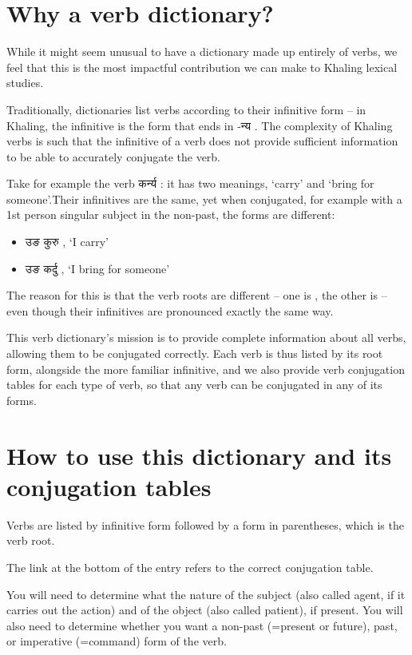 \section{Why a verb dictionary?}

While it might seem unusual to have a dictionary made up entirely of verbs, we feel that this is the most impactful contribution we can make to Khaling lexical studies.

Traditionally, dictionaries list verbs according to their infinitive form -- in Khaling, the infinitive is the form that ends in -न्य .  The complexity of Khaling verbs is such that the infinitive of a verb does not provide sufficient information  to be able to accurately conjugate the verb.

Take for example the verb कर्न्य : it has two meanings, `carry' and `bring for someone'.Their infinitives are the same, yet when conjugated, for example with a 1st person singular subject in the non-past, the forms are different:

\begin{itemize}
\item उङ कुरु  , `I carry'
\item उङ कर्दु , `I bring for someone'
\end{itemize}

The reason for this is that the verb roots are different -- one is , the other is  -- even though their infinitives are pronounced exactly the same way.

This verb dictionary's mission is to provide complete information about all verbs, allowing them to be conjugated correctly. Each verb is thus listed by its root form, alongside the more familiar infinitive, and we also provide verb conjugation tables for each type of verb, so that any verb can be conjugated in any of its forms.
 
\section{How to use this dictionary and its conjugation tables}
Verbs are listed by infinitive form followed by a form in parentheses, which is the verb root.

The link at the bottom of the entry refers to the correct conjugation table.

You will need to determine what the nature of the subject (also called agent, if it carries out the action) and of the object (also called patient), if present.  You will also need to determine whether you want a non-past (=present or future), past, or imperative (=command) form of the verb.

